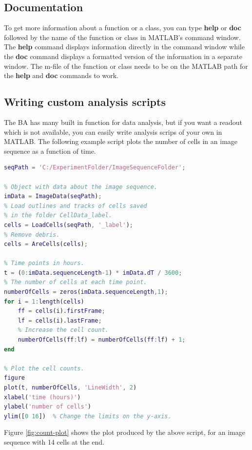 \documentclass[a4paper, oneside, onecolumn, 11pt]{article}
\newcommand{\command}[1]{\textbf{#1}}
\begin{document}
\subsection{Documentation}
To get more information about a function or a class, you can type \command{help} or \command{doc} followed by the name of the function or class in MATLAB's command window. The \command{help} command displays information directly in the command window while the \command{doc} command displays a formatted version of the information in a separate window. The m-file of the function or class needs to be on the MATLAB path for the \command{help} and \command{doc} commands to work.

\subsection{Writing custom analysis scripts}
The BA has many built in function for data analysis, but if you want a readout which is not available, you can easily write analysis scrips of your own in MATLAB. The following example script plots the number of cells in an image sequence as a function of time.
\begin{lstlisting}[language=Matlab]
% Path of the image sequence folder.
seqPath = 'C:/ExperimentFolder/ImageSequenceFolder';

% Object with data about the image sequence.
imData = ImageData(seqPath);
% Load outlines and tracks of cells saved
% in the folder CellData_label.
cells = LoadCells(seqPath, '_label');
% Remove debris.
cells = AreCells(cells);

% Time points in hours.
t = (0:imData.sequenceLength-1) * imData.dT / 3600;
% The number of cells at each time point.
numberOfCells = zeros(imData.sequenceLength,1);
for i = 1:length(cells)
    ff = cells(i).firstFrame;
    lf = cells(i).lastFrame;
    % Increase the cell count.
    numberOfCells(ff:lf) = numberOfCells(ff:lf) + 1;
end

% Plot the cell counts.
figure
plot(t, numberOfCells, 'LineWidth', 2)
xlabel('time (hours)')
ylabel('number of cells')
ylim([0 16])  % Change the limits on the y-axis.
\end{lstlisting}
Figure \ref{fig:count-plot} shows the plot produced by the above script, for an image sequence with 14 cells at the end.
\end{document}
